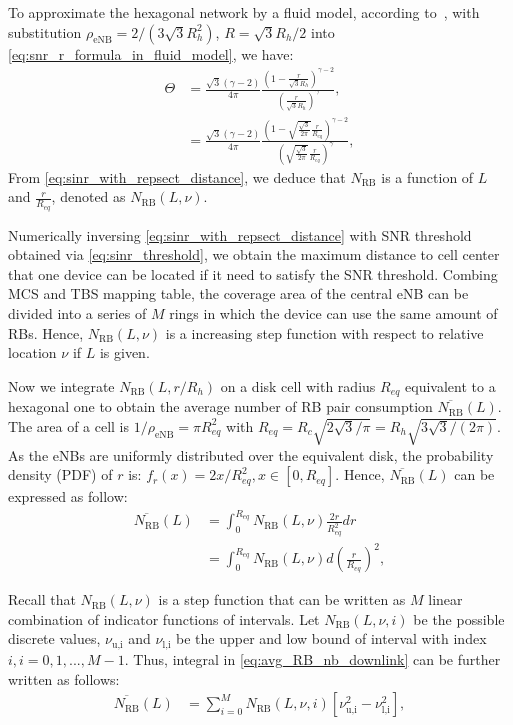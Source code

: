 To approximate the hexagonal network by a fluid model, according to~\cite{kelif2010fluid}, with substitution $\rho_{\text{eNB}} = 2/(3\sqrt{3} R_h^2)$, $R = \sqrt{3}R_h/2$ into \eqref{eq:snr_r_formula_in_fluid_model}, we have:  
\begin{align}
	\label{eq:sinr_with_repsect_distance}
	\Theta &= \frac{\sqrt{3} \left( \gamma - 2\right) }{4\pi} 
	\frac{(1 -\frac{r}{\sqrt{3} R_h})^{\gamma - 2}}{(\frac{r}{\sqrt{3}R_h})^{\gamma}}, \nonumber\\
	&= \frac{\sqrt{3} \left( \gamma - 2\right) }{4\pi} 
	\frac{(1 -\sqrt{  \frac {\sqrt{3}  }{  2\pi  }  }\frac{r}{R_{eq}})^{\gamma - 2}}{(\sqrt{  \frac {\sqrt{3}  }{  2\pi  }  }\frac{r}{R_{eq}})^{\gamma}}, 
\end{align}
From \eqref{eq:sinr_with_repsect_distance}, we deduce that $N_{\text{RB}}$ is a function of $L$ and $\frac{r}{R_{eq}}$, denoted as $N_{\text{RB}}(L, \nu)$.

Numerically inversing \eqref{eq:sinr_with_repsect_distance} with SNR threshold obtained via \eqref{eq:sinr_threshold}, we obtain the maximum distance to cell center that one device can be located if it need to satisfy the SNR threshold. Combing MCS and TBS mapping table, the coverage area of the central eNB can be divided into a series of $M$ rings in which the device can use the same amount of RBs. Hence, $N_{\text{RB}}(L, \nu)$ is a increasing step function with respect to relative location $\nu$ if $L$ is given.

Now we integrate $N_{\text{RB}}(L, r/R_h)$ on a disk cell with radius $R_{eq}$ equivalent to a hexagonal one to obtain the average number of RB pair consumption $\overline{N_{\text{RB}}}(L)$. The area of a cell is $1/\rho_{\text{eNB}} = \pi R_{eq}^2$ with $R_{eq} = R_c \sqrt{2\sqrt{3}/\pi} = R_h \sqrt{3\sqrt{3}/\left( 2\pi\right) } $. As the eNBs are uniformly distributed over the equivalent disk, the probability density (PDF) of $r$ is: $f_{r} (x) = 2x / R_{eq}^2, x \in \left[ 0, R_{eq}\right] $. Hence, $\overline{N_{\text{RB}}}(L)$ can be expressed as follow: 
\begin{align}
	\label{eq:avg_RB_nb_downlink}
	\overline{N_{\text{RB}}}(L)  &= \int_{0}^{R_{eq}} N_{\text{RB}}(L, \nu) \frac{2r}{R_{eq}^2}  dr \nonumber\\
	&=  \int_{0}^{R_{eq}} N_{\text{RB}}(L, \nu)  d (\frac{r}{R_{eq}})^2,
\end{align}

Recall that $N_{\text{RB}}(L,\nu)$ is a step function that can be written as $M$ linear combination of indicator functions of intervals. 
Let $N_{\text{RB}}(L, \nu, i)$ be the possible discrete values, $\nu_{\text{u,i}}$ and $\nu_{\text{l,i}}$ be the upper and low bound of interval with index $i, i =0, 1, ..., M-1 $. Thus, integral in \eqref{eq:avg_RB_nb_downlink} can be further written as follows:
\begin{align}
\label{eq:avg_RB_nb_downlink_final}
\overline{N_{\text{RB}}}(L) &= \sum_{i=0}^{M} N_{\text{RB}}(L, \nu, i) \left[ \nu_{\text{u,i}}^{2} - \nu_{\text{l,i}}^{2}\right],
\end{align}


